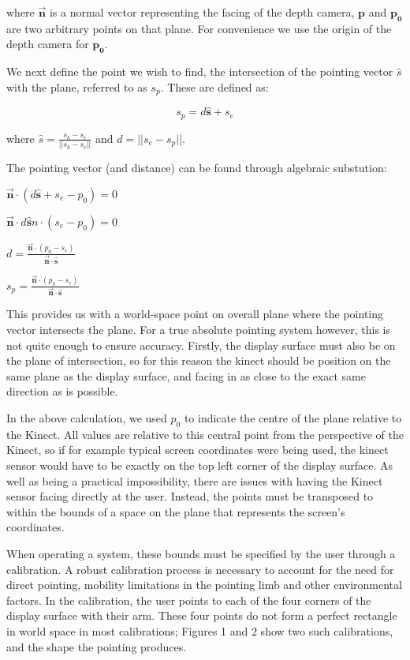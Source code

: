 where \(\mathbf{\vec{n}}\) is a normal vector representing the facing of the depth camera, \(\mathbf{p}\) and \(\mathbf{p_0}\) are two arbitrary points on that plane. For convenience we use the origin of the depth camera for \(\mathbf{p_0}\).

We next define the point we wish to find, the intersection of the pointing vector \(\hat{s}\) with the plane, referred to as \(s_p\). These are defined as:

\begin{equation}
s_p = d \hat{\mathbf{s}} + s_e
\end{equation}

where \(\hat{s} = \frac{s_h - s_e}{||s_h - s_e||}\) and \(d = ||s_e - s_p||\).

The pointing vector (and distance) can be found through algebraic substution:

\(\mathbf{\vec{n}} \cdot (d\hat{\mathbf{s}} + s_e - p_0) = 0\)

\(\mathbf{\vec{n}} \cdot d\hat{\mathbf{s}} n \cdot (s_e - p_0) = 0\)

\(d = \frac{\mathbf{\vec{n}} \cdot (p_0 - s_e)} {\mathbf{\vec{n}} \cdot \mathbf{\hat{s}}}\)

\(s_p = \frac {\mathbf{\vec{n}} \cdot ( p_0 - s_e)} {\mathbf{\vec{n}} \cdot \mathbf{\hat{s}}}\)


This provides us with a world-space point on overall plane where the pointing vector intersects the plane. For a true absolute pointing system however, this is not quite enough to ensure accuracy. Firstly, the display surface must also be on the plane of intersection, so for this reason the kinect should be position on the same plane as the display surface, and facing in as close to the exact same direction as is possible.

In the above calculation, we used \(p_0\) to indicate the centre of the plane relative to the Kinect. All values are relative to this central point from the perspective of the Kinect, so if for example typical screen coordinates were being used, the kinect sensor would have to be exactly on the top left corner of the display surface. As well as being a practical impossibility, there are issues with having the Kinect sensor facing directly at the user. Instead, the points must be transposed to within the bounds of a space on the plane that represents the screen's coordinates.

When operating a system, these bounds must be specified by the user through a calibration. A robust calibration process is necessary to account for the need for direct pointing, mobility limitations in the pointing limb and other environmental factors. In the calibration, the user points to each of the four corners of the display surface with their arm. These four points do not form a perfect rectangle in world space in most calibrations; Figures 1 and 2  show two such calibrations, and the shape the pointing produces.

